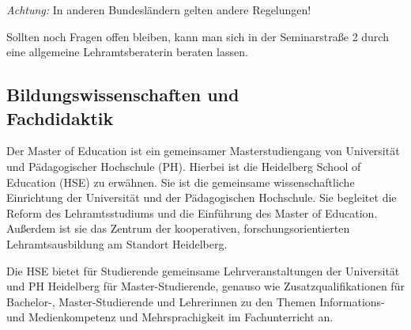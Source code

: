 \emph{Achtung:} In anderen Bundesländern gelten andere Regelungen!

Sollten noch Fragen offen bleiben, kann man sich in der Seminarstraße 2 durch eine allgemeine Lehramtsberaterin beraten lassen.

\vfill\eject

\subsection{Bildungswissenschaften und \\Fachdidaktik}
Der Master of Education ist ein gemeinsamer Masterstudiengang von Universität und Pädagogischer Hochschule (PH). Hierbei ist die Heidelberg School of  Education (HSE) zu erwähnen. Sie ist die gemeinsame wissenschaftliche Einrichtung der Universität und der Pädagogischen Hochschule. Sie begleitet die Reform des Lehramtsstudiums und die Einführung des Master of Education. Außerdem ist sie das Zentrum der kooperativen, forschungsorientierten Lehramtsausbildung am Standort Heidelberg.

Die HSE bietet für Studierende gemeinsame Lehrveranstaltungen der Universität und PH Heidelberg für Master-Studierende, genauso wie Zusatzqualifikationen für Bachelor-, Master-Studierende und Lehrerinnen zu den Themen Informations- und Medienkompetenz und Mehrsprachigkeit im Fachunterricht an.



